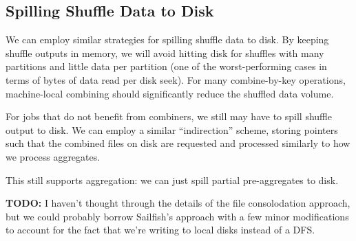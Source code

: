 \documentclass[12pt]{article}
\begin{document}
\subsection{Spilling Shuffle Data to Disk}

We can employ similar strategies for spilling shuffle data to disk.  By
keeping shuffle outputs in memory, we will avoid hitting disk for shuffles
with many partitions and little data per partition (one of the
worst-performing cases in terms of bytes of data read per disk seek).  For
many combine-by-key operations, machine-local combining should significantly
reduce the shuffled data volume.

For jobs that do not benefit from combiners, we still may have to spill
shuffle output to disk.  We can employ a similar ``indirection''
scheme, storing pointers such that the combined files on disk are requested
and processed similarly to how we process aggregates.

This still supports aggregation: we can just spill partial pre-aggregates to
disk.

\textbf{TODO:} I haven't thought through the details of the file consolodation
approach, but we could probably borrow Sailfish's approach with a few minor
modifications to account for the fact that we're writing to local disks
instead of a DFS.







\end{document}
